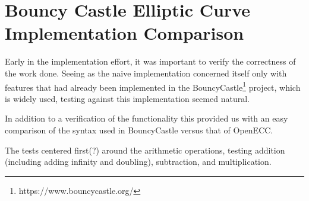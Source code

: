 \section{Bouncy Castle Elliptic Curve Implementation Comparison}

Early in the implementation effort, it was important to verify the correctness of the work done. Seeing
as the naive implementation concerned itself only with features that had already been implemented in
the BouncyCastle\footnote{https://www.bouncycastle.org/} project, which is widely used, testing against
this implementation seemed natural.

In addition to a verification of the functionality this provided us with an easy comparison of the syntax
used in BouncyCastle versus that of OpenECC.

The tests centered first(?) around the arithmetic operations, testing addition (including adding infinity
and doubling), subtraction, and multiplication.